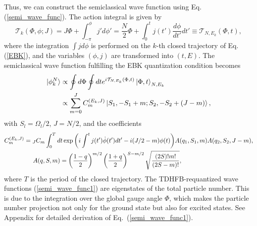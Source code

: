 \documentclass[%
superscriptaddress,
preprint,
showpacs,
nofootinbib,
amsmath,amssymb,
prc,
floatfix ]%
{revtex4-1}
\begin{document}
Thus, we can construct the semiclassical wave function using
Eq. (\ref{semi_wave_func}).
The action integral is given by
\begin{equation}
	\mathcal{T}_k(\Phi,\phi;J)
	= J\Phi + \int^\phi_{-\pi} j' d\phi' 
	= \frac{N}{2}\Phi + \int^t_0   %
	j(t') \frac{d\phi}{dt'} dt' 
\equiv \mathcal{T}_{N,E_k}(\Phi,t) ,
\end{equation}
where the integration $\int j d\phi$ is performed on the $k$-th
closed trajectory of Eq. (\ref{EBK}), and
the variables $(\phi,j)$ are transformed into $(t,E)$.
The semiclassical wave function fulfilling the EBK quantization condition
becomes
\begin{align}
	\ket{\phi_k^N} &\propto \oint d\Phi \oint dt
	e^{i\mathcal{T}_{N,E_k}(\Phi, t)}
	\ket{\Phi,t}_{N,E_k} \label{semi_wave_func0} \\
  &\propto \sum_{m=0}^{J}C_m^{(E_k,J)}\ket{S_1,-S_1+m;S_2,-S_2+(J-m)} ,
	\label{semi_wave_func1}
\end{align}
with $S_l=\Omega_l/2$, $J=N/2$, and the coefficients
\begin{align}
  C_m^{(E_k,J)} &= {}_J C_m\int_0^T dt \exp{\left( i\int^t j(t') \dot{\phi}(t') dt'-i(J/2-m)\phi(t) \right)}A(q_1,S_1,m)A(q_2,S_2,J-m) ,\\
  & \hspace{5mm} A(q,S,m) = \left(\frac{1-q}{2}\right)^{m/2}\left(\frac{1+q}{2}\right)^{S-m/2}\sqrt{\frac{(2S)!m!}{(2S-m)!}}, \hspace{5mm} \nonumber
\end{align}
where $T$ is the period of the closed trajectory.
The TDHFB-requantized wave functions (\ref{semi_wave_func1}) are
eigenstates of the total particle number.
This is due to the integration over the global gauge angle $\Phi$,
which makes the particle number projection not only for the ground state
but also for excited states.
See Appendix for detailed derivation of Eq.~(\ref{semi_wave_func1}). 
\end{document}
